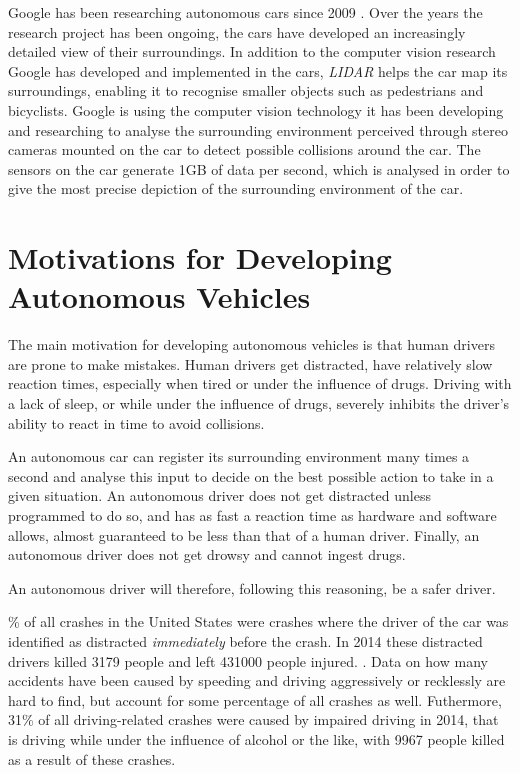 Google has been researching autonomous cars since 2009 \cite{googlecars}. Over the years the research project has been ongoing, the cars have developed an increasingly detailed view of their surroundings. In addition to the computer vision research Google has developed and implemented in the cars, \textit{LIDAR} helps the car map its surroundings, enabling it to recognise smaller objects such as pedestrians and bicyclists. Google is using the computer vision technology it has been developing and researching to analyse the surrounding environment perceived through stereo cameras mounted on the car to detect possible collisions around the car. The sensors on the car generate 1GB of data per second\cite{datagathering}, which is analysed in order to give the most precise depiction of the surrounding environment of the car. 

\section{Motivations for Developing Autonomous Vehicles}
The main motivation for developing autonomous vehicles is that human drivers are prone to make mistakes. Human drivers get distracted, have relatively slow reaction times, especially when tired or under the influence of drugs. Driving with a lack of sleep, or while under the influence of drugs, severely inhibits the driver's ability to react in time to avoid collisions. 

An autonomous car can register its surrounding environment many times a second and analyse this input to decide on the best possible action to take in a given situation. An autonomous driver does not get distracted unless programmed to do so, and has as fast a reaction time as hardware and software allows, almost guaranteed to be less than that of a human driver. Finally, an autonomous driver does not get drowsy and cannot ingest drugs. 

An autonomous driver will therefore, following this reasoning, be a safer driver. 

\% of all crashes in the United States were crashes where the driver of the car was identified as distracted \textit{immediately} before the crash. In 2014 these distracted drivers killed 3179 people and left 431000 people injured. \cite{distracteddriving}. Data on how many accidents have been caused by speeding and driving aggressively or recklessly are hard to find, but account for some percentage of all crashes as well.
Futhermore, 31\% of all driving-related crashes were caused by impaired driving in 2014, that is driving while under the influence of alcohol or the like, with 9967 people killed as a result of these crashes. \cite{impaireddriving}

